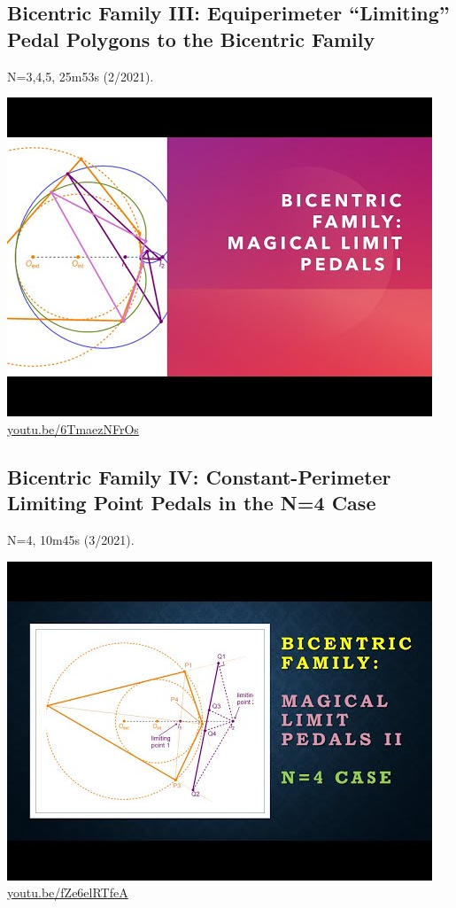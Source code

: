 \documentclass[12pt]{amsart}
\begin{document}
\subsection{Bicentric Family III: Equiperimeter ``Limiting'' Pedal Polygons to the Bicentric Family}
\label{vid:6TmaezNFrOs}
\noindent N=3,4,5, 25m53s (2/2021). 
\begin{center}\includegraphics[width=.5\textwidth]{pics/6TmaezNFrOs.jpg} \\ 
\href{https://youtu.be/6TmaezNFrOs}{\url{youtu.be/6TmaezNFrOs}}\end{center}
% 

\subsection{Bicentric Family IV: Constant-Perimeter Limiting Point Pedals in the N=4 Case}
\label{vid:fZe6elRTfeA}
\noindent N=4, 10m45s (3/2021). 
\begin{center}\includegraphics[width=.5\textwidth]{pics/fZe6elRTfeA.jpg} \\ 
\href{https://youtu.be/fZe6elRTfeA}{\url{youtu.be/fZe6elRTfeA}}\end{center}
% 
\end{document}
